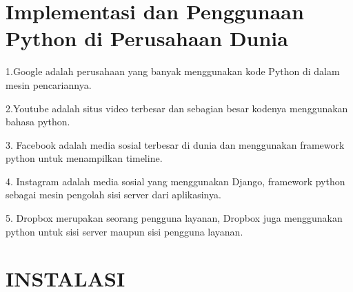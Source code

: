 \documentclass{article}
\begin{document}
\section{Implementasi dan Penggunaan Python di Perusahaan Dunia}
    \item 1.Google adalah perusahaan yang banyak menggunakan kode Python di dalam mesin pencariannya.
    \item 2.Youtube adalah situs video terbesar dan sebagian besar kodenya menggunakan bahasa python.
    \item 3. Facebook adalah media sosial terbesar di dunia dan menggunakan framework python untuk menampilkan timeline.
    \item 4. Instagram adalah media sosial yang menggunakan Django, framework python sebagai mesin pengolah sisi server dari aplikasinya.
    \item 5. Dropbox merupakan seorang pengguna layanan, Dropbox juga menggunakan python untuk sisi server maupun sisi pengguna layanan.

\newpage    
\section{INSTALASI}
\end{document}
